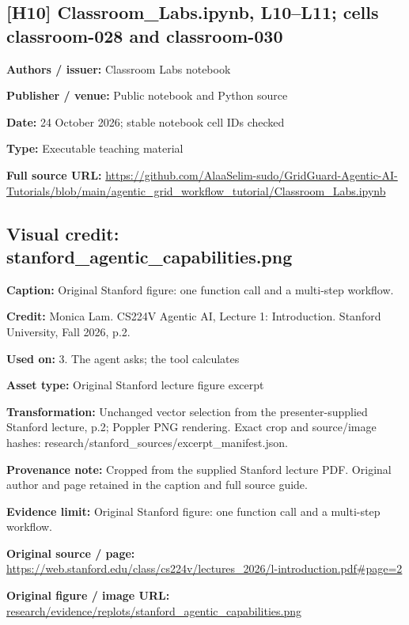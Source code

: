 \documentclass[10pt,letterpaper]{article}
\begin{document}
\subsection*{[H10] Classroom\_Labs.ipynb, L10--L11; cells classroom-028 and classroom-030}
\textbf{Authors / issuer:} Classroom Labs notebook\par
\textbf{Publisher / venue:} Public notebook and Python source\par
\textbf{Date:} 24 October 2026; stable notebook cell IDs checked\par
\textbf{Type:} Executable teaching material\par
\textbf{Full source URL:} \href{https://github.com/AlaaSelim-sudo/GridGuard-Agentic-AI-Tutorials/blob/main/agentic_grid_workflow_tutorial/Classroom_Labs.ipynb}{\small\ttfamily https:/\allowbreak{}/\allowbreak{}github.\allowbreak{}com/\allowbreak{}AlaaSelim-\allowbreak{}sudo/\allowbreak{}GridGuard-\allowbreak{}Agentic-\allowbreak{}AI-\allowbreak{}Tutorials/\allowbreak{}blob/\allowbreak{}main/\allowbreak{}agentic\_\allowbreak{}grid\_\allowbreak{}workflow\_\allowbreak{}tutorial/\allowbreak{}Classroom\_\allowbreak{}Labs.\allowbreak{}ipynb}\par
\par\medskip
\subsection*{Visual credit: stanford\_agentic\_capabilities.png}
\textbf{Caption:} Original Stanford figure: one function call and a multi-step workflow.\par
\textbf{Credit:} Monica Lam. CS224V Agentic AI, Lecture 1: Introduction. Stanford University, Fall 2026, p.2.\par
\textbf{Used on:} 3. The agent asks; the tool calculates\par
\textbf{Asset type:} Original Stanford lecture figure excerpt\par
\textbf{Transformation:} Unchanged vector selection from the presenter-supplied Stanford lecture, p.2; Poppler PNG rendering. Exact crop and source/image hashes: research/stanfor\allowbreak{}d\_sources/excerp\allowbreak{}t\_manifest.json.\par
\textbf{Provenance note:} Cropped from the supplied Stanford lecture PDF. Original author and page retained in the caption and full source guide.\par
\textbf{Evidence limit:} Original Stanford figure: one function call and a multi-step workflow.\par
\textbf{Original source / page:} \href{https://web.stanford.edu/class/cs224v/lectures_2026/l-introduction.pdf\#page=2}{\small\ttfamily https:/\allowbreak{}/\allowbreak{}web.\allowbreak{}stanford.\allowbreak{}edu/\allowbreak{}class/\allowbreak{}cs224v/\allowbreak{}lectures\_\allowbreak{}2026/\allowbreak{}l-\allowbreak{}introduction.\allowbreak{}pdf\#page=\allowbreak{}2}\par
\textbf{Original figure / image URL:} \href{../research/evidence/replots/stanford_agentic_capabilities.png}{\small\ttfamily research/\allowbreak{}evidence/\allowbreak{}replots/\allowbreak{}stanford\_\allowbreak{}agentic\_\allowbreak{}capabilities.\allowbreak{}png}\par
\par\medskip
\end{document}
